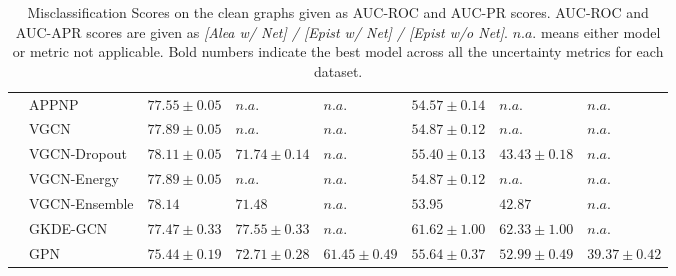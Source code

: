 \begin{table}[ht]
{\begin{tabular}{ll|lll|lll}
           &          APPNP &    $77.55 \pm 0.05$ &               $n.a.$ &                $n.a.$ &   $54.57 \pm 0.14$ &              $n.a.$ &               $n.a.$ \\
           &           VGCN &    $77.89 \pm 0.05$ &               $n.a.$ &                $n.a.$ &   $54.87 \pm 0.12$ &              $n.a.$ &               $n.a.$ \\
           &   VGCN-Dropout &    $78.11 \pm 0.05$ &    $71.74 \pm 0.14$ &                $n.a.$ &   $55.40 \pm 0.13$ &   $43.43 \pm 0.18$ &               $n.a.$ \\
           &    VGCN-Energy &    $77.89 \pm 0.05$ &               $n.a.$ &                $n.a.$ &   $54.87 \pm 0.12$ &              $n.a.$ &               $n.a.$ \\
           &  VGCN-Ensemble &             $\mathbf{78.14}$ &             $71.48$ &                $n.a.$ &            $53.95$ &            $42.87$ &               $n.a.$ \\
           &        GKDE-GCN &    $77.47 \pm 0.33$ &    $77.55 \pm 0.33$ &                $n.a.$ &   $\mathbf{61.62 \pm 1.00}$ &   $62.33 \pm 1.00$ &               $n.a.$ \\
           &            GPN &    $75.44 \pm 0.19$ &    $72.71 \pm 0.28$ &     $61.45 \pm 0.49$ &   $55.64 \pm 0.37$ &   $52.99 \pm 0.49$ &    $39.37 \pm 0.42$ \\
    \bottomrule
    \end{tabular}}
    \vspace{1em}
    \caption{Misclassification Scores on the clean graphs given as AUC-ROC and AUC-PR scores. AUC-ROC and AUC-APR scores are given as \emph{[Alea w/ Net] / [Epist w/ Net] / [Epist w/o Net]}. $n.a.$ means either model or metric not applicable. Bold numbers indicate the best model across all the uncertainty metrics for each dataset.}
    \label{tab:misclassification-two}
\end{table}



